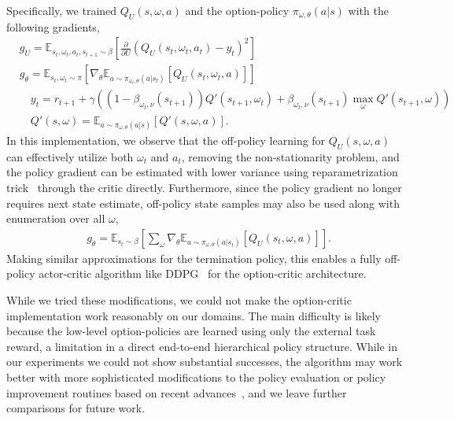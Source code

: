 \documentclass{article}
\begin{document}
Specifically,  
we trained $Q_U(s,\omega,a)$ and the option-policy $\pi_{\omega,\theta}(a|s)$ with the following gradients,
\begin{align}
&g_{U} = \mathbb{E}_{s_t,\omega_t,a_t,s_{t+1}\sim\beta}\left[\frac{\partial }{\partial U}\left( Q_U(s_t,\omega_t,a_t) - y_t \right)^2 \right] \\
&g_\theta = \mathbb{E}_{s_t,\omega_t\sim\pi} \left[ \nabla_\theta \mathbb{E}_{a\sim\pi_{\omega_t,\theta}(a|s_t)}\left[Q_U(s_t,\omega_t,a)\right] \right] \\
& \quad y_t = r_{t+1} + \gamma \left(\left(1-\beta_{\omega_t,\nu}(s_{t+1})\right)Q'(s_{t+1},\omega_t) + \beta_{\omega_t,\nu}(s_{t+1})\max_{\omega}Q'(s_{t+1},\omega)\right)\\
&\quad Q'(s,\omega) = \mathbb{E}_{a\sim\pi_{\omega,\theta}(a|s)}\left[Q'(s,\omega,a)\right].
\end{align}
In this implementation, we observe that the off-policy learning for $Q_U(s,\omega,a)$ can effectively utilize both $\omega_t$ and $a_t$, removing the non-stationarity problem, and the policy gradient can be estimated with lower variance using reparametrization trick~\cite{kingma2013auto} through the critic directly. Furthermore, since the policy gradient no longer requires next state estimate, off-policy state samples may also be used along with enumeration over all $\omega$,
\begin{align}
&g_\theta = \mathbb{E}_{s_t\sim\beta} \left[ \sum_\omega \nabla_\theta \mathbb{E}_{a\sim\pi_{\omega,\theta}(a|s_t)}\left[Q_U(s_t,\omega,a)\right] \right].
\end{align}
Making similar approximations for the termination policy, this enables a fully off-policy actor-critic algorithm like DDPG~\cite{ddpg} for the option-critic architecture.

While we tried these modifications, we could not make the option-critic implementation work reasonably on our domains. The main difficulty is likely because the low-level option-policies are learned using only the external task reward, a limitation in a direct end-to-end hierarchical policy structure. While in our experiments we could not show substantial successes, the algorithm may work better with more sophisticated modifications to the policy evaluation or policy improvement routines based on recent advances~\cite{munos2016safe,wang2017sample,gu2017interpolated,sac,td3}, and we leave further comparisons for future work.
\end{document}
